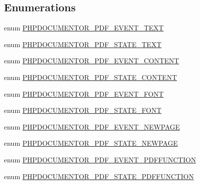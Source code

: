 \subsection*{\-Enumerations}
\begin{DoxyCompactItemize}
\item 
enum \hyperlink{_parser_p_d_f_8inc_a1f5ce416ca873f2f5d58168e27b178ca}{\-P\-H\-P\-D\-O\-C\-U\-M\-E\-N\-T\-O\-R\-\_\-\-P\-D\-F\-\_\-\-E\-V\-E\-N\-T\-\_\-\-T\-E\-X\-T} 
\item 
enum \hyperlink{_parser_p_d_f_8inc_aea8f59b57910483081ec1aa66cb74c42}{\-P\-H\-P\-D\-O\-C\-U\-M\-E\-N\-T\-O\-R\-\_\-\-P\-D\-F\-\_\-\-S\-T\-A\-T\-E\-\_\-\-T\-E\-X\-T} 
\item 
enum \hyperlink{_parser_p_d_f_8inc_a83c8b01b5e51f55524dc2357a62c4bc4}{\-P\-H\-P\-D\-O\-C\-U\-M\-E\-N\-T\-O\-R\-\_\-\-P\-D\-F\-\_\-\-E\-V\-E\-N\-T\-\_\-\-C\-O\-N\-T\-E\-N\-T} 
\item 
enum \hyperlink{_parser_p_d_f_8inc_a4f49d43c19f961dde1a109269c303682}{\-P\-H\-P\-D\-O\-C\-U\-M\-E\-N\-T\-O\-R\-\_\-\-P\-D\-F\-\_\-\-S\-T\-A\-T\-E\-\_\-\-C\-O\-N\-T\-E\-N\-T} 
\item 
enum \hyperlink{_parser_p_d_f_8inc_a76dce59f0071f5a2f5b64265b9501b41}{\-P\-H\-P\-D\-O\-C\-U\-M\-E\-N\-T\-O\-R\-\_\-\-P\-D\-F\-\_\-\-E\-V\-E\-N\-T\-\_\-\-F\-O\-N\-T} 
\item 
enum \hyperlink{_parser_p_d_f_8inc_abec996e0b3efc1b88929bcfd6fd8c826}{\-P\-H\-P\-D\-O\-C\-U\-M\-E\-N\-T\-O\-R\-\_\-\-P\-D\-F\-\_\-\-S\-T\-A\-T\-E\-\_\-\-F\-O\-N\-T} 
\item 
enum \hyperlink{_parser_p_d_f_8inc_ac040912835eaf307090c3f57a19bb72b}{\-P\-H\-P\-D\-O\-C\-U\-M\-E\-N\-T\-O\-R\-\_\-\-P\-D\-F\-\_\-\-E\-V\-E\-N\-T\-\_\-\-N\-E\-W\-P\-A\-G\-E} 
\item 
enum \hyperlink{_parser_p_d_f_8inc_a2b8e9f81bba9ede01c73c975b602ec6b}{\-P\-H\-P\-D\-O\-C\-U\-M\-E\-N\-T\-O\-R\-\_\-\-P\-D\-F\-\_\-\-S\-T\-A\-T\-E\-\_\-\-N\-E\-W\-P\-A\-G\-E} 
\item 
enum \hyperlink{_parser_p_d_f_8inc_a70b862883680ec35aff8deaa10af9535}{\-P\-H\-P\-D\-O\-C\-U\-M\-E\-N\-T\-O\-R\-\_\-\-P\-D\-F\-\_\-\-E\-V\-E\-N\-T\-\_\-\-P\-D\-F\-F\-U\-N\-C\-T\-I\-O\-N} 
\item 
enum \hyperlink{_parser_p_d_f_8inc_ab1af27bddc2b93b6060b2a9db7c0e347}{\-P\-H\-P\-D\-O\-C\-U\-M\-E\-N\-T\-O\-R\-\_\-\-P\-D\-F\-\_\-\-S\-T\-A\-T\-E\-\_\-\-P\-D\-F\-F\-U\-N\-C\-T\-I\-O\-N} 
\end{DoxyCompactItemize}


